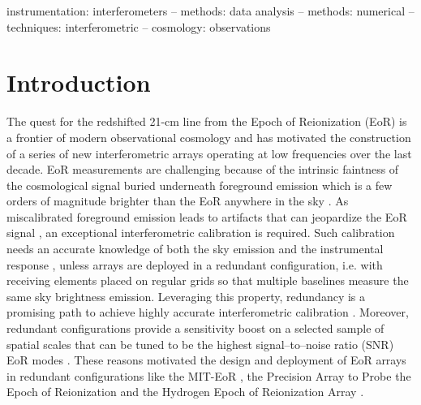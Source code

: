 \documentclass[useAMS,usenatbib]{mn2e}
\begin{document}
\begin{abstract}
\end{abstract}


\begin{keywords}
instrumentation: interferometers -- methods: data analysis -- methods: numerical --techniques: interferometric -- cosmology: observations
\end{keywords}

\section{Introduction}
The quest for the redshifted 21-cm line from the Epoch of Reionization (EoR) is a frontier of modern observational cosmology and has motivated the construction of a series of new interferometric arrays operating at low frequencies over the last decade. EoR measurements are challenging because of the intrinsic faintness of the cosmological signal \citep[see, for instance,][for recent reviews]{Furlanetto2016,McQuinn2016} buried underneath foreground emission which is a few orders of magnitude brighter than the EoR anywhere in the sky \citep[e.g.,][]{Bernardi2009,Bernardi2010,Ghosh2012,Dillon2014,Parsons2014}. 
As miscalibrated foreground emission leads to artifacts that can jeopardize the EoR signal \citep[e.g.,][]{grobler2014,barry2016,ewall-wice2016}, an exceptional interferometric calibration is required. Such calibration needs an accurate knowledge of both the sky emission and the instrumental response \citep[e.g.,][]{Smirnov2011c}, unless arrays are deployed in a redundant configuration, i.e. with receiving elements placed on regular grids so that multiple baselines measure the same sky brightness emission. Leveraging this property, redundancy is a promising path to achieve highly accurate interferometric calibration \citep[][]{Noordam1982,Wieringa1992,Pearson1984,Liu2010,Noorishad2012,Marthi2014,Sievers2017}. Moreover, redundant configurations provide a sensitivity boost on a selected sample of spatial scales that can be tuned to be the highest signal--to--noise ratio (SNR) EoR modes \citep[][]{Parsons2012,Dillon2016}. These reasons motivated the design and deployment of EoR arrays in redundant configurations like the MIT-EoR \citep{Zheng2014}, the Precision Array to Probe the Epoch of Reionization \citep[PAPER,][]{Ali2015} and the Hydrogen Epoch of Reionization Array \citep[HERA,][]{deboer2017}. 
\end{document}

